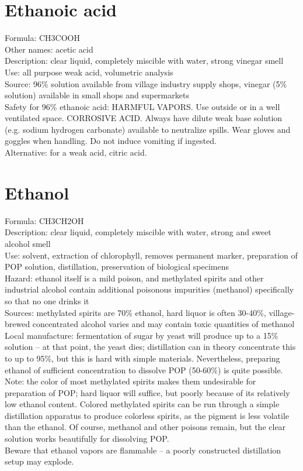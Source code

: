 \section{Ethanoic acid}
Formula: CH3COOH\\
Other names: acetic acid\\
Description: clear liquid, 
completely miscible with water, 
strong vinegar smell\\
Use: all purpose weak acid, 
volumetric analysis\\
Source: 96\% solution available from village industry supply shops, 
vinegar (5\% solution) available in small shops and supermarkets\\
Safety for 96\% ethanoic acid: HARMFUL VAPORS. 
Use outside or in a well ventilated space. 
CORROSIVE ACID. 
Always have dilute weak base solution (e.g. 
sodium hydrogen carbonate) available to neutralize spills. 
Wear gloves and goggles when handling. 
Do not induce vomiting if ingested.\\
Alternative: for a weak acid, 
citric acid. 

\section{Ethanol}
Formula: CH3CH2OH\\
Description: clear liquid, 
completely miscible with water, 
strong and sweet alcohol smell\\
Use: solvent, 
extraction of chlorophyll, 
removes permanent marker, 
preparation of POP solution, 
distillation, 
preservation of biological specimens\\
Hazard: ethanol itself is a mild poison, 
and methylated spirits and other industrial alcohol contain 
additional poisonous impurities (methanol) 
specifically so that no one drinks it\\
Sources: methylated spirits are 70\% ethanol, 
hard liquor is often 30-40\%, 
village-brewed concentrated alcohol varies 
and may contain toxic quantities of methanol\\
Local manufacture: fermentation of sugar by yeast will produce 
up to a 15\% solution – at that point, 
the yeast dies; 
distillation can in theory concentrate this to up to 95\%, 
but this is hard with simple materials. 
Nevertheless, 
preparing ethanol of sufficient concentration to dissolve POP (50-60\%) 
is quite possible.\\
Note: the color of most methylated spirits makes them undesirable 
for preparation of POP; 
hard liquor will suffice, 
but poorly because of its relatively low ethanol content. 
Colored methylated spirits can be run 
through a simple distillation apparatus to produce colorless spirits, 
as the pigment is less volatile than the ethanol. 
Of course, 
methanol and other poisons remain, 
but the clear solution works beautifully for dissolving POP.\\ 
Beware that ethanol vapors are flammable – 
a poorly constructed distillation setup may explode.


